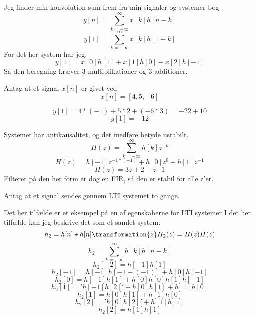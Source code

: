\begin{rubrik}
    \begin{eksamensOpgave}
        \begin{UnderOpgave}
            Jeg finder min konvolution sum frem fra min signaler og systemer bog
            \[y[n] = \sum_{k = -\infty}^{\infty}{x[k] h[n - k]}\]
            \[y[1] = \sum_{k = -\infty}^{\infty}{x[k] h[1 - k]}\]
            For det her system har jeg. 
            \[y[1] = x[0]h[1] + x[1]h[0] + x[2]h[-1]\]
            Så den beregning kræver 3 multiplikationer og 3 additioner. 
        \end{UnderOpgave}
        Antag at et signal $x[n]$ er givet ved 
        \[x[n] = [4, 5, -6]\]
        \begin{UnderOpgave}
            \[y[1] = 4 * (-1) + 5 * 2 + (-6 * 3) = -22 + 10\]
            \[y[1] = -12\]
        \end{UnderOpgave}
        \begin{UnderOpgave}
            Systemet har antikausalitet, og det medføre betyde ustabilt. 
            \[H(z) = \sum_{k = -\infty}^{\infty}h[k]z^{-k}\]
            \[H(z) = h[-1]z^{-1*(-1)} + h[0]z^0 + h[1]z^{-1}\]
            \[H(z) = 3z + 2 - z{-1}\]
            Filteret på den her form er dog en FIR, så den er stabil for alle z'er.             
        \end{UnderOpgave}
        Antag at et signal sendes gennem LTI systemet to gange. 
        \begin{UnderOpgave}
            Det her tilfælde er et eksempel på en af egenskaberne for LTI systemer
            I det her tilfælde kan jeg beskrive det som et samlet system.
            \[h_2 = h[n]\star h[n] \transformation{z} H_2(z) = H(z)H(z)\]
            \[h_2 = \sum_{k = -\infty}^{\infty}{h[k]h[n - k]}\]
            \[h_2[-2]= h[-1]h[1]\]
            \[h_2[-1] = h[-1]h[-1 - (-1)] + h[0]h[-1]\]
            \[h_2[0] = h[-1]h[1] + h[0]h[0] h[1]h[-1]\]
            \[h_2[1] = 'h[-1]h[2]' + h[0]h[1] + h[1]h[0]\]
            \[h_2[1] = h[0]h[1] + h[1]h[0]\]
            \[h_2[2] = 'h[0]h[2]' + h[1]h[1]\]
            \[h_2[2] = h[1]h[1]\]


\end{UnderOpgave}
\end{eksamensOpgave}
\end{rubrik}
